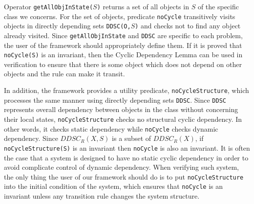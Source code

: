 \documentclass[12pt]{report}
\newcommand{\stt}[1]{{\small{\tt {#1}}}}
\begin{document}
Operator \stt{getAllObjInState($S$)} returns a set of all objects in
$S$ of the specific class we concerns. For the set of objects,
predicate {\tt noCycle} transitively visits objects in directly
depending sets \stt{DDSC(O,$S$)} and checks not to find any object
already visited. Since {\tt getAllObjInState} and {\tt DDSC} are
specific to each problem, the user of the framework should
appropriately define them. If it is proved that \stt{noCycle(S)} is an
invariant, then the Cyclic Dependency Lemma can be used in
verification to ensure that there is some object which does not depend
on other objects and the rule can make it transit.

In addition, the framework provides a utility predicate,
{\tt noCycleStructure}, which processes the same manner using directly
depending sets {\tt DDSC}. Since {\tt DDSC} represents overall
dependency between objects in the class without concerning their local
states, {\tt noCycleStructure} checks no structural cyclic dependency.
In other words, it checks static dependency while {\tt noCycle} checks
dynamic dependency. Since $DDSC_R(X,S)$ is a subset of $DDSC_R(X)$,
if \stt{noCycleStructure(S)} is an invariant then {\tt noCycle} is also
an invariant. It is often the case that a system is designed to
have no static cyclic dependency in order to avoid complicate control
of dynamic dependency. When verifying such system, the only thing
the user of our framework should do is to put {\tt noCycleStructure} into
the initial condition of the system, which ensures that {\tt noCycle}
is an invariant unless any transition rule changes the system structure.
\end{document}
